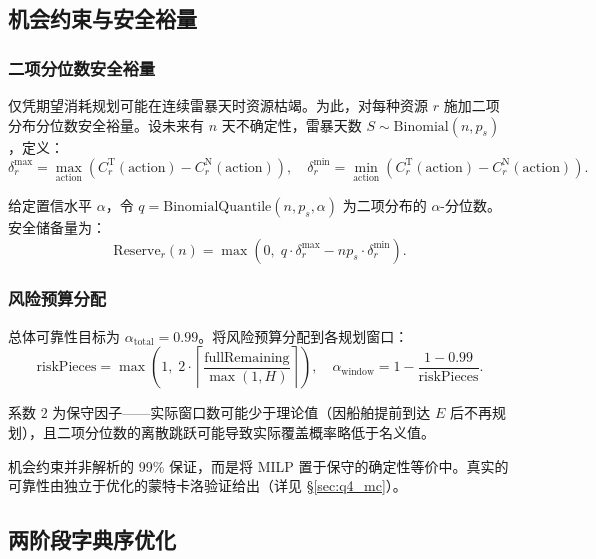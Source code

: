 \subsection{机会约束与安全裕量}

\subsubsection{二项分位数安全裕量}

仅凭期望消耗规划可能在连续雷暴天时资源枯竭。为此，对每种资源 $r$ 施加二项分布分位数安全裕量。设未来有 $n$ 天不确定性，雷暴天数 $S\sim\mathrm{Binomial}(n, p_s)$，定义：
\begin{equation}
\delta_r^{\max} = \max_{\text{action}} \left(C_r^{\text{T}}(\text{action}) - C_r^{\text{N}}(\text{action})\right),\quad
\delta_r^{\min} = \min_{\text{action}} \left(C_r^{\text{T}}(\text{action}) - C_r^{\text{N}}(\text{action})\right).
\end{equation}

给定置信水平 $\alpha$，令 $q=\mathrm{BinomialQuantile}(n, p_s, \alpha)$ 为二项分布的 $\alpha$-分位数。安全储备量为：
\begin{equation}\label{eq:q4_reserve}
\mathrm{Reserve}_r(n) = \max\left(0,\; q\cdot \delta_r^{\max} - n p_s\cdot \delta_r^{\min}\right).
\end{equation}

\subsubsection{风险预算分配}

总体可靠性目标为 $\alpha_{\text{total}}=0.99$。将风险预算分配到各规划窗口：
\begin{equation}
\mathrm{riskPieces} = \max\left(1,\; 2\cdot\left\lceil\frac{\text{fullRemaining}}{\max(1,H)}\right\rceil\right),\quad
\alpha_{\text{window}} = 1 - \frac{1-0.99}{\mathrm{riskPieces}}.
\end{equation}

系数 $2$ 为保守因子——实际窗口数可能少于理论值（因船舶提前到达 $E$ 后不再规划），且二项分位数的离散跳跃可能导致实际覆盖概率略低于名义值。

机会约束并非解析的 99\% 保证，而是将 MILP 置于保守的确定性等价中。真实的可靠性由独立于优化的蒙特卡洛验证给出（详见 \S\ref{sec:q4_mc}）。

\subsection{两阶段字典序优化}

